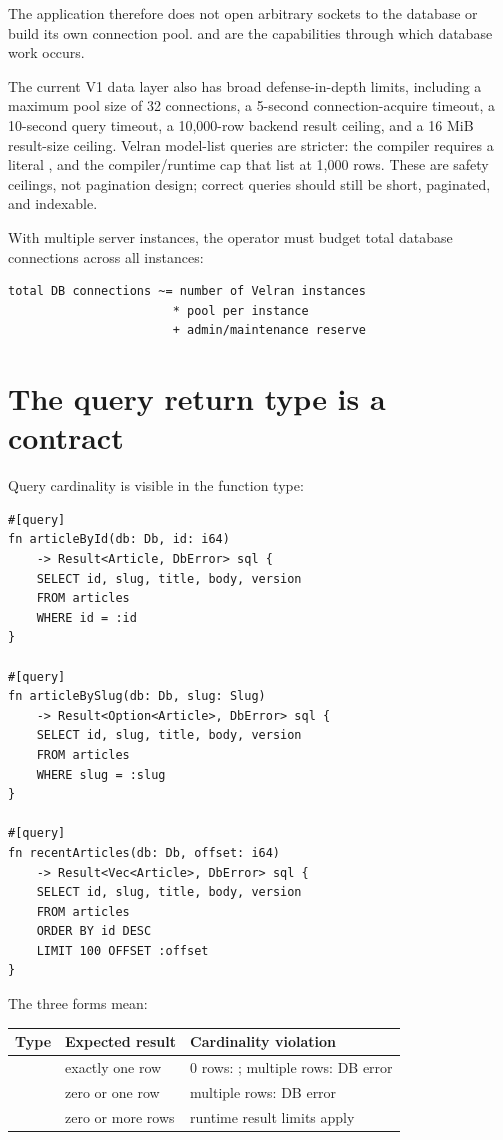 The application therefore does not open arbitrary sockets to the database or build its own connection pool.  and  are the capabilities through which database work occurs.

The current V1 data layer also has broad defense-in-depth limits, including a maximum pool size of 32 connections, a 5-second connection-acquire timeout, a 10-second query timeout, a 10,000-row backend result ceiling, and a 16 MiB result-size ceiling. Velran model-list queries are stricter: the compiler requires a literal , and the compiler/runtime cap that list at 1,000 rows. These are safety ceilings, not pagination design; correct queries should still be short, paginated, and indexable.

With multiple server instances, the operator must budget total database connections across all instances:

\begin{lstlisting}
total DB connections ~= number of Velran instances
                       * pool per instance
                       + admin/maintenance reserve
\end{lstlisting}

\section{The query return type is a contract}

Query cardinality is visible in the function type:

\begin{lstlisting}[language=Velran]
#[query]
fn articleById(db: Db, id: i64)
    -> Result<Article, DbError> sql {
    SELECT id, slug, title, body, version
    FROM articles
    WHERE id = :id
}

#[query]
fn articleBySlug(db: Db, slug: Slug)
    -> Result<Option<Article>, DbError> sql {
    SELECT id, slug, title, body, version
    FROM articles
    WHERE slug = :slug
}

#[query]
fn recentArticles(db: Db, offset: i64)
    -> Result<Vec<Article>, DbError> sql {
    SELECT id, slug, title, body, version
    FROM articles
    ORDER BY id DESC
    LIMIT 100 OFFSET :offset
}
\end{lstlisting}

The three forms mean:

\begin{center}
\begin{tabularx}{\textwidth}{@{}L{0.23\textwidth}YY@{}}
\toprule
Type & Expected result & Cardinality violation \\
\midrule
{} & exactly one row & 0 rows: ; multiple rows: DB error \\
 & zero or one row & multiple rows: DB error \\
 & zero or more rows & runtime result limits apply \\
\bottomrule
\end{tabularx}
\end{center}

